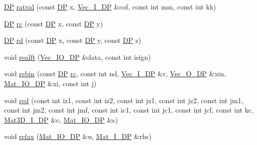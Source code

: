 \begin{DoxyCompactItemize}
\item 
\mbox{\hyperlink{namespaceNR_af6ff762dd605ff477b8e52387253a02a}{DP}} \mbox{\hyperlink{namespaceNR_a3acd42aca134502c65fb52c385218e33}{ratval}} (const \mbox{\hyperlink{namespaceNR_af6ff762dd605ff477b8e52387253a02a}{DP}} x, \mbox{\hyperlink{namespaceNR_a9f943da53862537c552e2a770cb170ae}{Vec\+\_\+\+I\+\_\+\+DP}} \&cof, const int mm, const int kk)
\item 
\mbox{\hyperlink{namespaceNR_af6ff762dd605ff477b8e52387253a02a}{DP}} \mbox{\hyperlink{namespaceNR_a7d42c86df6be02b1e38a5bf9a51884d8}{rc}} (const \mbox{\hyperlink{namespaceNR_af6ff762dd605ff477b8e52387253a02a}{DP}} x, const \mbox{\hyperlink{namespaceNR_af6ff762dd605ff477b8e52387253a02a}{DP}} y)
\item 
\mbox{\hyperlink{namespaceNR_af6ff762dd605ff477b8e52387253a02a}{DP}} \mbox{\hyperlink{namespaceNR_a06e58a52a06276e59cdd77e651547f2c}{rd}} (const \mbox{\hyperlink{namespaceNR_af6ff762dd605ff477b8e52387253a02a}{DP}} x, const \mbox{\hyperlink{namespaceNR_af6ff762dd605ff477b8e52387253a02a}{DP}} y, const \mbox{\hyperlink{namespaceNR_af6ff762dd605ff477b8e52387253a02a}{DP}} z)
\item 
void \mbox{\hyperlink{namespaceNR_a6e6be7f8710c23ce1bba137a8b15ed43}{realft}} (\mbox{\hyperlink{namespaceNR_ab293e06a6bf799d8a7ed932b6852bcb8}{Vec\+\_\+\+I\+O\+\_\+\+DP}} \&data, const int isign)
\item 
void \mbox{\hyperlink{namespaceNR_a057f6d96cc5618a7d3b0d1a44a946a56}{rebin}} (const \mbox{\hyperlink{namespaceNR_af6ff762dd605ff477b8e52387253a02a}{DP}} \mbox{\hyperlink{namespaceNR_a7d42c86df6be02b1e38a5bf9a51884d8}{rc}}, const int nd, \mbox{\hyperlink{namespaceNR_a9f943da53862537c552e2a770cb170ae}{Vec\+\_\+\+I\+\_\+\+DP}} \&r, \mbox{\hyperlink{namespaceNR_a970094d23441f8ef6a45282a7eb2103d}{Vec\+\_\+\+O\+\_\+\+DP}} \&xin, \mbox{\hyperlink{namespaceNR_ad1513aa4697878ed3bff0b8b3c9dd910}{Mat\+\_\+\+I\+O\+\_\+\+DP}} \&xi, const int j)
\item 
void \mbox{\hyperlink{namespaceNR_a5d0fa7b2278cdceacefe8cd50705176f}{red}} (const int iz1, const int iz2, const int jz1, const int jz2, const int jm1, const int jm2, const int jmf, const int ic1, const int jc1, const int jcf, const int kc, \mbox{\hyperlink{namespaceNR_a3cb7a4c8eb0a2a98a239a9a8200ec5d8}{Mat3\+D\+\_\+\+I\+\_\+\+DP}} \&c, \mbox{\hyperlink{namespaceNR_ad1513aa4697878ed3bff0b8b3c9dd910}{Mat\+\_\+\+I\+O\+\_\+\+DP}} \&s)
\item 
void \mbox{\hyperlink{namespaceNR_addb2b8e753b62caf1b43dd6f236c651a}{relax}} (\mbox{\hyperlink{namespaceNR_ad1513aa4697878ed3bff0b8b3c9dd910}{Mat\+\_\+\+I\+O\+\_\+\+DP}} \&u, \mbox{\hyperlink{namespaceNR_a2b8abfda8fffad6ba0a1b5a4c0773dbf}{Mat\+\_\+\+I\+\_\+\+DP}} \&rhs)

\end{DoxyCompactItemize}
